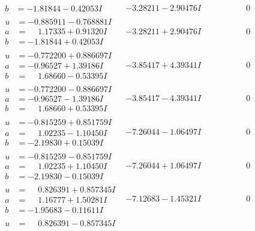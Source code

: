 \documentclass[1p]{elsarticle_modified}
\theoremstyle{definition}
\begin{document}
$$\begin{array}{c|c|c}
\begin{aligned}
b &= -1.81844 - 0.42053 I\end{aligned}
 & -3.28211 - 2.90476 I & \phantom{-0.000000 } 0 \\ \hline\begin{aligned}
u &= -0.885911 - 0.768881 I \\
a &= \phantom{-}1.17335 + 0.91320 I \\
b &= -1.81844 + 0.42053 I\end{aligned}
 & -3.28211 + 2.90476 I & \phantom{-0.000000 } 0 \\ \hline\begin{aligned}
u &= -0.772200 + 0.886697 I \\
a &= -0.96527 + 1.39186 I \\
b &= \phantom{-}1.68660 - 0.53395 I\end{aligned}
 & -3.85417 + 4.39341 I & \phantom{-0.000000 } 0 \\ \hline\begin{aligned}
u &= -0.772200 - 0.886697 I \\
a &= -0.96527 - 1.39186 I \\
b &= \phantom{-}1.68660 + 0.53395 I\end{aligned}
 & -3.85417 - 4.39341 I & \phantom{-0.000000 } 0 \\ \hline\begin{aligned}
u &= -0.815259 + 0.851759 I \\
a &= \phantom{-}1.02235 - 1.10450 I \\
b &= -2.19830 + 0.15039 I\end{aligned}
 & -7.26044 - 1.06497 I & \phantom{-0.000000 } 0 \\ \hline\begin{aligned}
u &= -0.815259 - 0.851759 I \\
a &= \phantom{-}1.02235 + 1.10450 I \\
b &= -2.19830 - 0.15039 I\end{aligned}
 & -7.26044 + 1.06497 I & \phantom{-0.000000 } 0 \\ \hline\begin{aligned}
u &= \phantom{-}0.826391 + 0.857345 I \\
a &= \phantom{-}1.16777 + 1.50281 I \\
b &= -1.95683 - 0.11611 I\end{aligned}
 & -7.12683 - 1.45321 I & \phantom{-0.000000 } 0 \\ \hline\begin{aligned}
u &= \phantom{-}0.826391 - 0.857345 I \\

\end{aligned}
\end{array}$$
\end{document}
